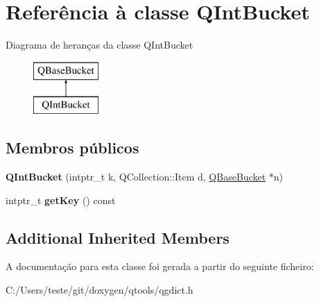 \hypertarget{class_q_int_bucket}{\section{Referência à classe Q\-Int\-Bucket}
\label{class_q_int_bucket}
}
Diagrama de heranças da classe Q\-Int\-Bucket\begin{figure}[H]
\begin{center}
\leavevmode
\includegraphics[height=2.000000cm]{class_q_int_bucket}
\end{center}
\end{figure}
\subsection*{Membros públicos}
\begin{DoxyCompactItemize}
\item 
\hypertarget{class_q_int_bucket_a461cc3751b8ab880da7fc9ebf70af1e8}{{\bfseries Q\-Int\-Bucket} (intptr\-\_\-t k, Q\-Collection\-::\-Item d, \hyperlink{class_q_base_bucket}{Q\-Base\-Bucket} $\ast$n)}\label{class_q_int_bucket_a461cc3751b8ab880da7fc9ebf70af1e8}

\item 
\hypertarget{class_q_int_bucket_a0904cebc1170bb04a10af10b414555cd}{intptr\-\_\-t {\bfseries get\-Key} () const }\label{class_q_int_bucket_a0904cebc1170bb04a10af10b414555cd}

\end{DoxyCompactItemize}
\subsection*{Additional Inherited Members}


A documentação para esta classe foi gerada a partir do seguinte ficheiro\-:\begin{DoxyCompactItemize}
\item 
C\-:/\-Users/teste/git/doxygen/qtools/qgdict.\-h\end{DoxyCompactItemize}
